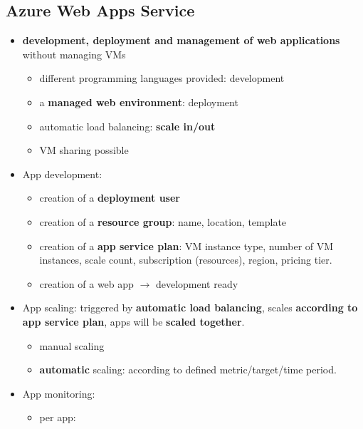 \subsection{Azure Web Apps Service}
\begin{itemize}
	\item \textbf{development, deployment and management of web applications} without managing VMs
	\begin{itemize}
		\item different programming languages provided: development
		\item a \textbf{managed web environment}: deployment
		\item automatic load balancing: \textbf{scale in/out}
		\item VM sharing possible
	\end{itemize}
	\item App development:
	\begin{itemize}
		\item creation of a \textbf{deployment user}
		\item creation of a \textbf{resource group}: name, location, template
		\item creation of a \textbf{app service plan}: VM instance type, number of VM instances, scale count, subscription (resources), region, pricing tier.
		\item creation of a web app $\rightarrow$ development ready
	\end{itemize}
	\item App scaling: triggered by \textbf{automatic load balancing}, scales \textbf{according to app service plan}, apps will be \textbf{scaled together}. 
	\begin{itemize}
		\item manual scaling
		\item \textbf{automatic} scaling: according to defined metric/target/time period. 
	\end{itemize}
	\item App monitoring: 
	\begin{itemize}
		\item per app: 
		

\end{itemize}
\end{itemize}
